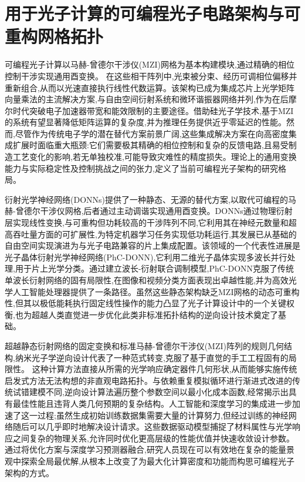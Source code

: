 \section{用于光子计算的可编程光子电路架构与可重构网格拓扑}\label{ux7528ux4e8eux5149ux5b50ux8ba1ux7b97ux7684ux53efux7f16ux7a0bux5149ux5b50ux7535ux8defux67b6ux6784ux4e0eux53efux91cdux6784ux7f51ux683cux62d3ux6251}

可编程光子计算以马赫-曾德尔干涉仪(MZI)网格为基本构建模块,通过精确的相位控制干涉实现通用酉变换。\citep{doi_10_48550_arxiv_2407_03235_fe345c4b} \citep{doi_10_1063_5_0235712_fb28986d} 在这些相干阵列中,光束被分束、经历可调相位偏移并重新组合,从而以光速直接执行线性代数运算。该架构已成为集成芯片上光学矩阵向量乘法的主流解决方案,与自由空间衍射系统和微环谐振器网络并列,作为在后摩尔时代突破电子加速器带宽和能效限制的主要途径。借助硅光子学技术,基于MZI的系统有望显著降低矩阵运算的复杂度,并为推理任务提供近乎零延迟的性能。然而,尽管作为传统电子学的潜在替代方案前景广阔,这些集成解决方案在向高密度集成扩展时面临重大瓶颈:它们需要极其精确的相位控制和复杂的反馈电路,且易受制造工艺变化的影响,若无单独校准,可能导致灾难性的精度损失。理论上的通用变换能力与实际稳定性及控制挑战之间的张力,定义了当前可编程光子架构的研究格局。\citep{doi_10_1109_tnano_2022_3223915_d4da3e6b} \citep{doi_10_1088_1402_4896_ae8345_3b948559}

衍射光学神经网络(DONNs)提供了一种静态、无源的替代方案,以取代可编程的马赫-曾德尔干涉仪网格,后者通过主动调谐实现通用酉变换。DONNs通过物理衍射层实现线性变换,与可重构但功耗较高的干涉阵列不同,它利用其在神经元数量和超高吞吐量方面的可扩展性,为特定机器学习任务实现低功耗运行,其发展已从基础的自由空间实现演进为与光子电路兼容的片上集成配置。该领域的一个代表性进展是光子晶体衍射光学神经网络(PhC-DONN),它利用二维光子晶体实现多波长并行处理,用于片上光学分类。通过建立波长-衍射联合调制模型,PhC-DONN克服了传统单波长衍射网络的固有局限性,在图像和视频分类方面表现出卓越性能,并为高效光学人工智能处理器提供了一条路径。虽然这些静态架构缺乏MZI网格的动态可重构性,但其以极低能耗执行固定线性操作的能力凸显了光子计算设计中的一个关键权衡,也为超越人类直觉进一步优化此类非标准拓扑结构的逆向设计技术奠定了基础。\citep{doi_10_1002_nap2_70098_8d5f2f8a} \citep{doi_10_1515_nanoph_2025_0168_86a0f7aa}

超越静态衍射网络的固定变换和标准马赫-曾德尔干涉仪(MZI)阵列的规则几何结构,纳米光子学逆向设计代表了一种范式转变,克服了基于直觉的手工工程固有的局限性。\citep{doi_10_1088_1361_6633_ae7f9a_e05f9b1d} \citep{doi_10_1109_icufn61752_2024_10625552_985a60f2} 这种计算方法直接从所需的光学响应确定器件几何形状,从而能够实施传统启发式方法无法构想的非直观电路拓扑。与依赖重复模拟循环进行渐进式改进的传统试错建模不同,逆向设计算法遍历整个参数空间以最小化成本函数,经常揭示出具有最佳性能且违背人类几何预期的复杂结构。人工智能和深度学习的集成进一步加速了这一过程;虽然生成初始训练数据集需要大量的计算努力,但经过训练的神经网络随后可以几乎即时地解决设计请求。这些数据驱动模型捕捉了材料属性与光学响应之间复杂的物理关系,允许同时优化更高层级的性能优值并快速收敛设计参数。通过将优化方案与深度学习预测器融合,研究人员现在可以有效地在复杂的能量景观中探索全局最优解,从根本上改变了为最大化计算密度和功能而构思可编程光子架构的方式。\citep{doi_10_1515_nanoph_2021_0660_2d91a441} \citep{doi_10_1515_nanoph_2018_0183_d85e9193}

